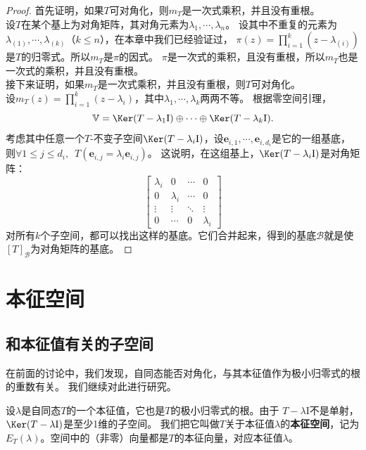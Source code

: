 \documentclass[12pt,UTF8]{ctexbook}
\begin{document}
\begin{proof} %
    首先证明，如果$T$可对角化，则$m_T$是一次式乘积，并且没有重根。\\
    设$T$在某个基上为对角矩阵，其对角元素为$\lambda_1, \cdots, \lambda_n$。
    设其中不重复的元素为$\lambda_{(1)}, \cdots, \lambda_{(k)}$（$k \leqslant n$），在本章中我们已经验证过，
    $ \pi(z) = \prod_{i=1}^k (z - \lambda_{(i)})$是$T$的归零式。所以$m_T$是$\pi$的因式。
    $\pi$是一次式的乘积，且没有重根，所以$m_T$也是一次式的乘积，并且没有重根。\\
    接下来证明，如果$m_T$是一次式乘积，并且没有重根，则$T$可对角化。\\
    设$m_T(z) = \prod_{i=1}^k(z - \lambda_i)$，其中$\lambda_1, \cdots , \lambda_k$两两不等。
    根据零空间引理，
    $$\mathbb{V} = \Ker (T - \lambda_1\mathrm{I}) \oplus \cdots \oplus \Ker (T - \lambda_k\mathrm{I}).$$
    考虑其中任意一个$T$-不变子空间$\Ker (T - \lambda_i\mathrm{I})$，设$\mathbf{e}_{i,1}, \cdots , \mathbf{e}_{i,d_i}$是它的一组基底，
    则$\forall 1 \leqslant j \leqslant d_i, \,\,\, T(\mathbf{e}_{i,j} = \lambda_i \mathbf{e}_{i,j})$。
    这说明，在这组基上，$\Ker (T - \lambda_i\mathrm{I})$是对角矩阵：
    $$ \begin{bmatrix}
        \lambda_i & 0 & \cdots & 0 \\
        0 & \lambda_i & \cdots & 0 \\
        \vdots & \vdots & \ddots & \vdots \\
        0 & \cdots & 0 & \lambda_i
    \end{bmatrix}$$
    对所有$k$个子空间，都可以找出这样的基底。它们合并起来，得到的基底$\mathcal{B}$就是使$[T]_\mathcal{B}$为对角矩阵的基底。

\end{proof}

\section{本征空间}
\subsection{和本征值有关的子空间}
在前面的讨论中，我们发现，自同态能否对角化，与其本征值作为极小归零式的根的重数有关。
我们继续对此进行研究。

设$\lambda$是自同态$T$的一个本征值，它也是$T$的极小归零式的根。由于
$T - \lambda \mathrm{I}$不是单射，$\Ker (T - \lambda \mathrm{I})$是至少1维的子空间。
我们把它叫做$T$关于本征值$\lambda$的\textbf{本征空间}，记为$E_T(\lambda)$。空间中的（非零）向量都是$T$的本征向量，对应本征值$\lambda$。
\end{document}
